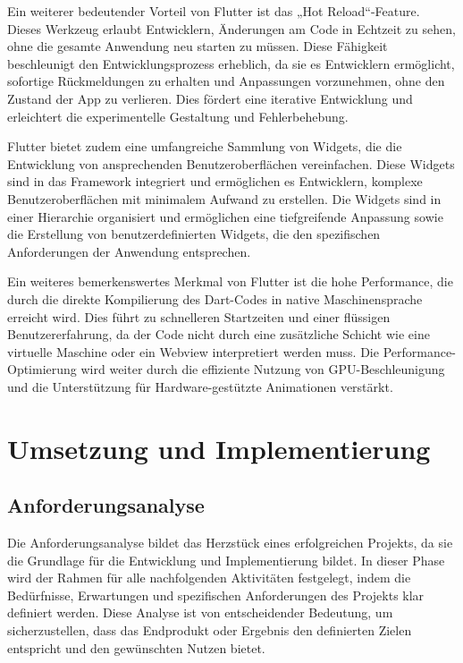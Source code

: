 \documentclass[oneside]{ausarbeitung}
\begin{document}
Ein weiterer bedeutender Vorteil von Flutter ist das „Hot Reload“-Feature. Dieses Werkzeug erlaubt Entwicklern, Änderungen am Code in Echtzeit zu sehen, ohne die gesamte Anwendung neu starten zu müssen. Diese Fähigkeit beschleunigt den Entwicklungsprozess erheblich, da sie es Entwicklern ermöglicht, sofortige Rückmeldungen zu erhalten und Anpassungen vorzunehmen, ohne den Zustand der App zu verlieren. Dies fördert eine iterative Entwicklung und erleichtert die experimentelle Gestaltung und Fehlerbehebung.

Flutter bietet zudem eine umfangreiche Sammlung von Widgets, die die Entwicklung von ansprechenden Benutzeroberflächen vereinfachen. Diese Widgets sind in das Framework integriert und ermöglichen es Entwicklern, komplexe Benutzeroberflächen mit minimalem Aufwand zu erstellen. Die Widgets sind in einer Hierarchie organisiert und ermöglichen eine tiefgreifende Anpassung sowie die Erstellung von benutzerdefinierten Widgets, die den spezifischen Anforderungen der Anwendung entsprechen.

Ein weiteres bemerkenswertes Merkmal von Flutter ist die hohe Performance, die durch die direkte Kompilierung des Dart-Codes in native Maschinensprache erreicht wird. Dies führt zu schnelleren Startzeiten und einer flüssigen Benutzererfahrung, da der Code nicht durch eine zusätzliche Schicht wie eine virtuelle Maschine oder ein Webview interpretiert werden muss. Die Performance-Optimierung wird weiter durch die effiziente Nutzung von GPU-Beschleunigung und die Unterstützung für Hardware-gestützte Animationen verstärkt.

\chapter{Umsetzung und Implementierung}
\label{cha:implement}

\section{Anforderungsanalyse}
\label{sec:implement_requirements}

Die Anforderungsanalyse bildet das Herzstück eines erfolgreichen Projekts, da sie die Grundlage für die Entwicklung und Implementierung bildet. In dieser Phase wird der Rahmen für alle nachfolgenden Aktivitäten festgelegt, indem die Bedürfnisse, Erwartungen und spezifischen Anforderungen des Projekts klar definiert werden. Diese Analyse ist von entscheidender Bedeutung, um sicherzustellen, dass das Endprodukt oder Ergebnis den definierten Zielen entspricht und den gewünschten Nutzen bietet.
\end{document}
